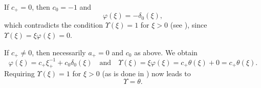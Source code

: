 \documentclass[sumlimits,intlimits,namelimits%
]{amsart}
\theoremstyle{definition}
\newcommand{\beq}{\begin{equation}}
\newcommand{\eeq}{\end{equation}}
\newcommand{\de}{\delta}
\newcommand{\vphi}{\varphi}
\begin{document}
If $c_+ = 0$, then $c_0 = -1$ and
$$
   \vphi(\xi) = - \de_0(\xi),
$$
which contradicts the condition $\Upsilon(\xi) = 1$ for $\xi > 0$ (see \cite{GEW,GPOT}), since $\Upsilon(\xi) = \xi \vphi(\xi) = 0$.

If $c_+ \neq 0$, then necessarily $a_+ = 0$ and $c_0$ as above. We obtain
$$
    \vphi(\xi) = c_+ \xi_+^{-1} + c_0 \de_0(\xi) \quad\text{and}\quad 
    \Upsilon(\xi) = \xi \vphi(\xi) = c_+ \theta(\xi) +  0 = c_+ \theta(\xi).
$$
Requiring  $\Upsilon(\xi) = 1$ for $\xi > 0$ (as is done in \cite{GEW,GPOT}) now leads to
\beq\label{UassozTheta3}
   \Upsilon = \theta.
\eeq







\end{document}

